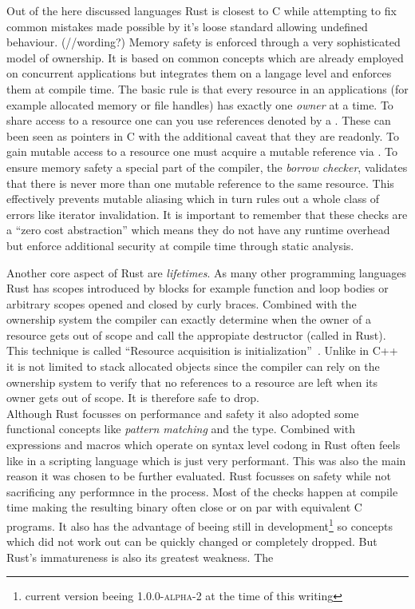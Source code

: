 Out of the here discussed languages Rust is closest to C while attempting to fix common mistakes made possible by it's loose standard allowing undefined behaviour. (//wording?) Memory safety is enforced through a very sophisticated model of ownership. It is based on common concepts which are already employed on concurrent applications but integrates them on a langage level and enforces them at compile time. The basic rule is that every resource in an applications (for example allocated memory or file handles) has exactly one \textit{owner} at a time. To share access to a resource one can you use references denoted by a \markdowninline{\&}. These can been seen as pointers in C with the additional caveat that they are readonly. To gain mutable access to a resource one must acquire a mutable reference via . To ensure memory safety a special part of the compiler, the \textit{borrow checker}, validates that there is never more than one mutable reference to the same resource. This effectively prevents mutable aliasing which in turn rules out a whole class of errors like iterator invalidation. It is important to remember that these checks are a ``zero cost abstraction'' which means they do not have any runtime overhead but enforce additional security at compile time through static analysis.

Another core aspect of Rust are \textit{lifetimes}. As many other programming languages Rust has scopes introduced by blocks for example function and loop bodies or arbitrary scopes opened and closed by curly braces. Combined with the ownership system the compiler can exactly determine when the owner of a resource gets out of scope and call the appropiate destructor (called  in Rust). This technique is called ``Resource acquisition is initialization''~\cite[p. 389]{evolution_c++}. Unlike in C++ it is not limited to stack allocated objects since the compiler can rely on the ownership system to verify that no references to a resource are left when its owner gets out of scope. It is therefore safe to drop.
\\


Although Rust focusses on performance and safety it also adopted some functional concepts like \textit{pattern matching} and the  type. Combined with  expressions and macros which operate on syntax level codong in Rust often feels like in a scripting language which is just very performant. This was also the main reason it was chosen to be further evaluated. Rust focusses on safety while not sacrificing any performnce in the process. Most of the checks happen at compile time making the resulting binary often close or on par with equivalent C programs. It also has the advantage of beeing still in development\footnote{current version beeing \textsc{1.0.0-alpha-2} at the time of this writing} so concepts which did not work out can be quickly changed or completely dropped.
But Rust's immatureness is also its greatest weakness. The

